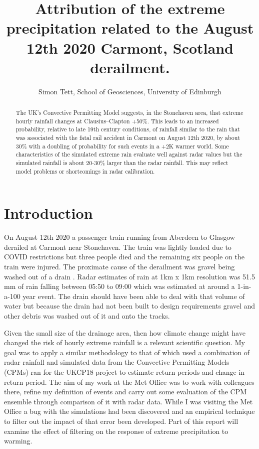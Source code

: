 \documentclass[11pt,a4paper]{article}
\title{Attribution of the  extreme precipitation related to the August 12th 2020 Carmont, Scotland derailment.}
\author{Simon Tett, School of Geosciences, University of Edinburgh}
\begin{document}
\maketitle
\graphicspath{{../figures/}}
\begin{abstract}
	The UK's Convective Permitting Model suggests, in the Stonehaven area, that extreme hourly rainfall changes at Clausius–Clapton +50\%. This leads to an increased probability, relative to late 19th century conditions,  of rainfall similar to the rain that was associated with the fatal rail accident in Carmont on August 12th 2020, by about 30\% with a doubling of probability for such events in a +2K warmer world. Some characteristics of the simulated extreme rain evaluate well against radar values but the  simulated rainfall is about 20-30\% larger than the radar rainfall. This may reflect model problems or shortcomings in  radar  calibration. 
\end{abstract}

\section{Introduction}

On August 12th 2020 a passenger train running from Aberdeen to Glasgow derailed at Carmont near Stonehaven. The train was lightly loaded due to COVID restrictions but three people died and the remaining six people on the train  were injured. The proximate cause of the derailment was gravel being washed out of a drain \parencite{carmontReport2024}. Radar estimates of  rain at 1km x 1km resolution was 51.5 mm of rain falling between 05:50 to 09:00 which was estimated at around a 1-in-a-100 year event. The drain should have been able to deal with that volume of water but because the drain had not been built to design requirements gravel and other debris was washed out of it and onto the tracks. 

Given the small size of the drainage area, then how climate change might have changed the risk of hourly extreme rainfall is a relevant scientific question. My goal was to apply a similar methodology to that of  \textcite{Tett2023} which used a combination of radar rainfall and simulated data from the Convective Permitting Models (CPMs) ran for the UKCP18 project\parencite{ukcp2019cpm} to estimate return periods and change in return period. The aim of my work at the Met Office was to work with colleagues there, refine my definition of events and carry out some evaluation of the CPM ensemble through comparison of it with radar data. While I was visiting the Met Office a bug with the simulations had been discovered and an empirical technique to filter out the impact of that error been developed. Part of this report will examine the effect of filtering on the response of extreme precipitation to warming. 
\end{document}
